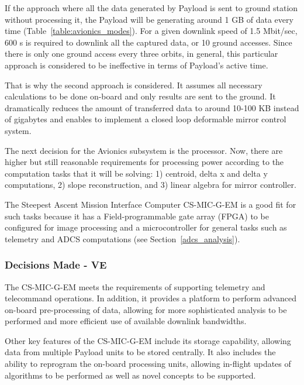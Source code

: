 \documentclass[12pt]{article}
\begin{document}
If the approach where all the data generated by Payload is sent to ground station without processing it, the Payload will be generating around 1 GB of data every time (Table~\ref{table:avionics_modes}). For a given downlink speed of 1.5 Mbit/sec, 600 s is required to downlink all the captured data, or 10 ground accesses. Since there is only one ground access every three orbits, in general, this particular approach is considered to be ineffective in terms of Payload’s active time.

That is why the second approach is considered. It assumes all necessary calculations to be done on-board and only results are sent to the ground. It dramatically reduces the amount of transferred data to around 10-100 KB instead of gigabytes and enables to implement a closed loop deformable mirror control system.

The next decision for the Avionics subsystem is the processor. Now, there are higher but still reasonable requirements for processing power according to the computation tasks that it will be solving:
1) centroid, delta x and delta y computations, 2) slope reconstruction, and 3) linear algebra for mirror controller.

The Steepest Ascent Mission Interface Computer CS-MIC-G-EM is a good fit for such tasks because it has a Field-programmable gate array (FPGA) to be configured for image processing and a microcontroller for general tasks such as telemetry and ADCS computations (see Section~\ref{adcs_analysis}).



\subsubsection{Decisions Made - VE}

The CS-MIC-G-EM meets the requirements of supporting telemetry and telecommand operations.  In addition, it provides a platform to perform advanced on-board pre-processing of data, allowing for more sophisticated analysis to be performed and more efficient use of available downlink bandwidths. 

Other key features of the CS-MIC-G-EM include its storage capability, allowing data from multiple Payload units to be stored centrally.  It also includes the ability to reprogram the on-board processing units, allowing in-flight updates of algorithms to be performed as well as novel concepts to be supported.
\end{document}
